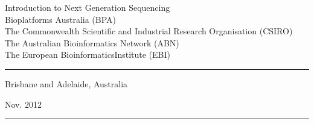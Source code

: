 \documentclass[a4paper]{article}
\title{\workshopTitle}
\date{\workshopDate}
\author{\workshopAuthor}
\newcommand{\workshopTitle}{Introduction to Next Generation Sequencing}
\newcommand{\workshopVenue}{Brisbane and Adelaide, Australia}
\newcommand{\workshopDate}{Nov. 2012}
\newcommand{\workshopAuthor}{
Bioplatforms Australia (BPA)\\
The Commonwealth Scientific and Industrial Research Organisation (CSIRO)\\
The Australian Bioinformatics Network (ABN)\\
The European BioinformaticsInstitute (EBI)
}
\begin{document}
%
%
\noindent

\begin{center}
\vspace*{\fill}
{\huge\workshopTitle}\\[1cm]
\workshopAuthor

\vfill
\ccby

%
\vfill

\rule{\textwidth}{1pt}
\begin{minipage}{0.45\textwidth}
\begin{flushleft}
\workshopVenue
\end{flushleft}
\end{minipage}
\begin{minipage}{0.45\textwidth}
\begin{flushright}
\workshopDate
\end{flushright}
\end{minipage}

\rule{\textwidth}{1pt}
\end{center}

\clearpage


%
%

\clearpage

%
%

\end{document}
